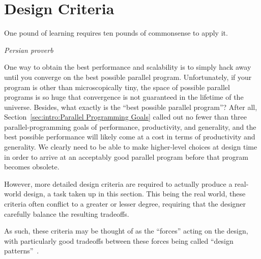 
\section{Design Criteria}
\label{sec:SMPdesign:Design Criteria}
%
\epigraph{One pound of learning requires ten pounds of commonsense to apply it.}
	 {\emph{Persian proverb}}

One way to obtain the best performance and scalability is to simply
hack away until you converge on the best possible parallel program.
Unfortunately, if your program is other than microscopically tiny,
the space of possible parallel programs is so huge
that convergence is not guaranteed in the lifetime of the universe.
Besides, what exactly is the ``best possible parallel program''?
After all, Section~\ref{sec:intro:Parallel Programming Goals}
called out no fewer than three parallel-programming goals of
performance, productivity, and generality,
and the best possible performance will likely come at a cost in
terms of productivity and generality.
We clearly need to be able to make higher-level choices at design
time in order to arrive at an acceptably good parallel program
before that program becomes obsolete.

However, more detailed design criteria are required to
actually produce a real-world design, a task taken up in this section.
This being the real world, these criteria often conflict to a
greater or lesser degree, requiring that the designer carefully
balance the resulting tradeoffs.

As such, these criteria may be thought of as the ``forces''
acting on the design, with particularly good tradeoffs between
these forces being called ``design patterns''~\cite{Alexander79,GOF95}.

